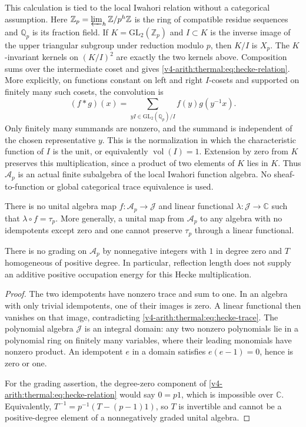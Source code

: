 This calculation is tied to the local Iwahori relation without a
categorical assumption. Here
$\mathbb Z_p=\varprojlim_h\mathbb Z/p^h\mathbb Z$ is the ring
of compatible residue sequences and $\mathbb Q_p$ is its fraction
field. If $K=\mathrm{GL}_2(\mathbb Z_p)$ and
$I\subset K$ is the inverse image of the upper triangular subgroup
under reduction modulo $p$, then $K/I$ is $X_p$.
The $K$-invariant kernels on $(K/I)^2$ are exactly the two kernels
above. Composition sums over the intermediate coset and gives
\eqref{v4-arith:thermal:eq:hecke-relation}. More explicitly, on functions constant
on left and right $I$-cosets and supported on finitely many such
cosets, the convolution is
\[
 (f*g)(x)=\sum_{yI\in\mathrm{GL}_2(\mathbb Q_p)/I}
                    f(y)g(y^{-1}x).
\]
Only finitely many summands are nonzero, and the summand is
independent of the chosen representative $y$. This is the
normalization in which the characteristic function of $I$ is the
unit, or equivalently $\operatorname{vol}(I)=1$. Extension by zero
from $K$ preserves this multiplication, since a product of two
elements of $K$ lies in $K$. Thus
$\mathcal A_p$ is an actual finite subalgebra of the local
Iwahori function algebra. No sheaf-to-function or global
categorical trace equivalence is used.

\begin{theorem}
\label{v4-arith:thermal:thm:hecke-obstruction}
There is no unital algebra map $f:\mathcal A_p\to\mathcal J$
and linear functional $\lambda:\mathcal J\to\mathbb C$ such that
$\lambda\circ f=\tau_p$.
More generally, a unital map from $\mathcal A_p$ to any algebra
with no idempotents except zero and one cannot preserve $\tau_p$
through a linear functional.

There is no grading on $\mathcal A_p$ by nonnegative integers
with $1$ in degree zero and $T$ homogeneous of positive degree.
In particular, reflection length does not supply an additive
positive occupation energy for this Hecke multiplication.
\end{theorem}

\begin{proof}
The two idempotents have nonzero trace and sum to one. In an
algebra with only trivial idempotents, one of their images is
zero. A linear functional then vanishes on that image, contradicting
\eqref{v4-arith:thermal:eq:hecke-trace}. The polynomial algebra $\mathcal J$ is
an integral domain: any two nonzero polynomials lie in a polynomial
ring on finitely many variables, where their leading monomials
have nonzero product. An idempotent $e$ in a domain satisfies
$e(e-1)=0$, hence is zero or one.

For the grading assertion, the degree-zero component of
\eqref{v4-arith:thermal:eq:hecke-relation} would say $0=p1$, which is impossible
over $\mathbb C$. Equivalently,
$T^{-1}=p^{-1}(T-(p-1)1)$, so $T$ is invertible and cannot be a
positive-degree element of a nonnegatively graded unital algebra.
\end{proof}

